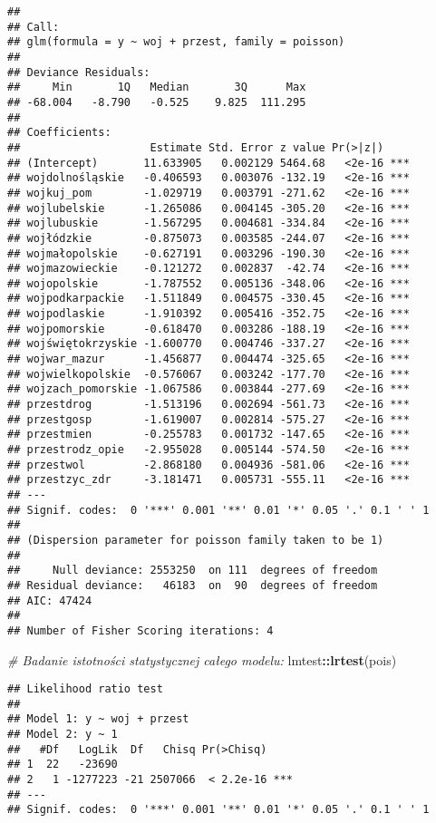 \documentclass[polish,]{book}
\newenvironment{Shaded}{\begin{snugshade}}{\end{snugshade}}
\newcommand{\CommentTok}[1]{\textcolor[rgb]{0.56,0.35,0.01}{\textit{#1}}}
\newcommand{\KeywordTok}[1]{\textcolor[rgb]{0.13,0.29,0.53}{\textbf{#1}}}
\newcommand{\NormalTok}[1]{#1}
\newcommand{\OperatorTok}[1]{\textcolor[rgb]{0.81,0.36,0.00}{\textbf{#1}}}
\begin{document}
\begin{verbatim}
## 
## Call:
## glm(formula = y ~ woj + przest, family = poisson)
## 
## Deviance Residuals: 
##     Min       1Q   Median       3Q      Max  
## -68.004   -8.790   -0.525    9.825  111.295  
## 
## Coefficients:
##                    Estimate Std. Error z value Pr(>|z|)    
## (Intercept)       11.633905   0.002129 5464.68   <2e-16 ***
## wojdolnośląskie   -0.406593   0.003076 -132.19   <2e-16 ***
## wojkuj_pom        -1.029719   0.003791 -271.62   <2e-16 ***
## wojlubelskie      -1.265086   0.004145 -305.20   <2e-16 ***
## wojlubuskie       -1.567295   0.004681 -334.84   <2e-16 ***
## wojłódzkie        -0.875073   0.003585 -244.07   <2e-16 ***
## wojmałopolskie    -0.627191   0.003296 -190.30   <2e-16 ***
## wojmazowieckie    -0.121272   0.002837  -42.74   <2e-16 ***
## wojopolskie       -1.787552   0.005136 -348.06   <2e-16 ***
## wojpodkarpackie   -1.511849   0.004575 -330.45   <2e-16 ***
## wojpodlaskie      -1.910392   0.005416 -352.75   <2e-16 ***
## wojpomorskie      -0.618470   0.003286 -188.19   <2e-16 ***
## wojświętokrzyskie -1.600770   0.004746 -337.27   <2e-16 ***
## wojwar_mazur      -1.456877   0.004474 -325.65   <2e-16 ***
## wojwielkopolskie  -0.576067   0.003242 -177.70   <2e-16 ***
## wojzach_pomorskie -1.067586   0.003844 -277.69   <2e-16 ***
## przestdrog        -1.513196   0.002694 -561.73   <2e-16 ***
## przestgosp        -1.619007   0.002814 -575.27   <2e-16 ***
## przestmien        -0.255783   0.001732 -147.65   <2e-16 ***
## przestrodz_opie   -2.955028   0.005144 -574.50   <2e-16 ***
## przestwol         -2.868180   0.004936 -581.06   <2e-16 ***
## przestzyc_zdr     -3.181471   0.005731 -555.11   <2e-16 ***
## ---
## Signif. codes:  0 '***' 0.001 '**' 0.01 '*' 0.05 '.' 0.1 ' ' 1
## 
## (Dispersion parameter for poisson family taken to be 1)
## 
##     Null deviance: 2553250  on 111  degrees of freedom
## Residual deviance:   46183  on  90  degrees of freedom
## AIC: 47424
## 
## Number of Fisher Scoring iterations: 4
\end{verbatim}

\begin{Shaded}
\begin{Highlighting}[]
\CommentTok{# Badanie istotności statystycznej całego modelu:}
\NormalTok{lmtest}\OperatorTok{::}\KeywordTok{lrtest}\NormalTok{(pois)}
\end{Highlighting}
\end{Shaded}

\begin{verbatim}
## Likelihood ratio test
## 
## Model 1: y ~ woj + przest
## Model 2: y ~ 1
##   #Df   LogLik  Df   Chisq Pr(>Chisq)    
## 1  22   -23690                           
## 2   1 -1277223 -21 2507066  < 2.2e-16 ***
## ---
## Signif. codes:  0 '***' 0.001 '**' 0.01 '*' 0.05 '.' 0.1 ' ' 1
\end{verbatim}
\end{document}
